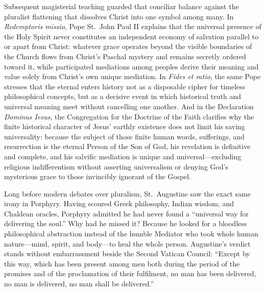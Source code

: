 Subsequent magisterial teaching guarded that conciliar balance against the pluralist flattening that dissolves Christ into one symbol among many. In \textit{Redemptoris missio}, Pope St.\ John Paul II explains that the universal presence of the Holy Spirit never constitutes an independent economy of salvation parallel to or apart from Christ: whatever grace operates beyond the visible boundaries of the Church flows from Christ's Paschal mystery and remains secretly ordered toward it, while participated mediations among peoples derive their meaning and value solely from Christ's own unique mediation. In \textit{Fides et ratio}, the same Pope stresses that the eternal enters history not as a disposable cipher for timeless philosophical concepts, but as a decisive event in which historical truth and universal meaning meet without cancelling one another. And in the Declaration \textit{Dominus Iesus}, the Congregation for the Doctrine of the Faith clarifies why the finite historical character of Jesus' earthly existence does not limit his saving universality: because the subject of those finite human words, sufferings, and resurrection is the eternal Person of the Son of God, his revelation is definitive and complete, and his salvific mediation is unique and universal---excluding religious indifferentism without asserting universalism or denying God's mysterious grace to those invincibly ignorant of the Gospel.

Long before modern debates over pluralism, St.\ Augustine saw the exact same irony in Porphyry. Having scoured Greek philosophy, Indian wisdom, and Chaldean oracles, Porphyry admitted he had never found a ``universal way for delivering the soul.'' Why had he missed it? Because he looked for a bloodless philosophical abstraction instead of the humble Mediator who took whole human nature---mind, spirit, and body---to heal the whole person. Augustine's verdict stands without embarrassment beside the Second Vatican Council: ``Except by this way, which has been present among men both during the period of the promises and of the proclamation of their fulfilment, no man has been delivered, no man is delivered, no man shall be delivered.''

